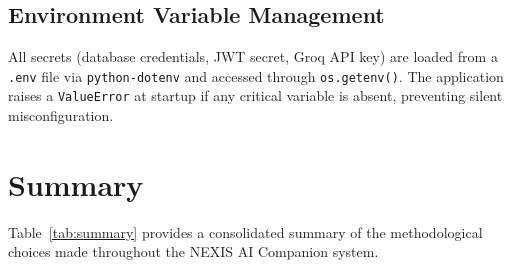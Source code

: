 \documentclass[12pt,a4paper]{article}
\begin{document}
\subsection{Environment Variable Management}

All secrets (database credentials, JWT secret, Groq API key) are loaded
from a \texttt{.env} file via \texttt{python-dotenv} and accessed through
\texttt{os.getenv()}. The application raises a \texttt{ValueError} at
startup if any critical variable is absent, preventing silent misconfiguration.

\section{Summary}
\label{sec:summary}

Table~\ref{tab:summary} provides a consolidated summary of the methodological
choices made throughout the NEXIS AI Companion system.
\end{document}
